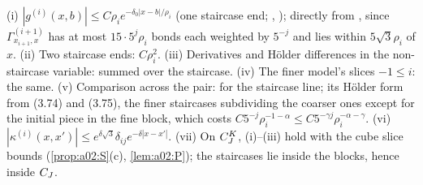 \begin{lemma}\label{lem:a02:Bsp}
(i) $|g^{(i)}(x,b)|\le C\rho_ie^{-\delta_0|x-b|/\rho_i}$ (one staircase end; \cite[(3.64)]{K1}, \cite[(2.12)]{Ba3}); directly from \cite[(3.63)]{K1}, since $\Gamma^{(i+1)}_{x_{i+1},x}$ has at most $15\cdot5^{j}\rho_i$ bonds each weighted by $5^{-j}$ and lies within $5\sqrt3\rho_i$ of $x$. (ii) Two staircase ends: $C\rho_i^{2}$. (iii) Derivatives and H\"older differences in the non-staircase variable: \cite[(3.63), (3.65)]{K1} summed over the staircase. (iv) The finer model's slices $-1\le i$: the same. (v) Comparison across the pair: \cite[(3.74)]{K1} for the staircase line; its H\"older form from (3.74) and (3.75), the finer staircases subdividing the coarser ones except for the initial piece in the fine block, which costs $C5^{-j}\rho_i^{-1-\alpha}\le C5^{-\gamma j}\rho_i^{-\alpha-\gamma}$. (vi) $|\kappa^{(i)}(x,x')|\le e^{\delta\sqrt3}\delta_{ij}e^{-\delta|x-x'|}$. (vii) On $C^{K}_{J}$, (i)--(iii) hold with the cube slice bounds (\cref{prop:a02:S}(c), \cref{lem:a02:P}); the staircases lie inside the blocks, hence inside $C_J$.
\end{lemma}

